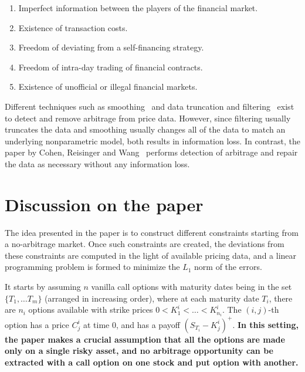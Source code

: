 \documentclass[12pt]{article}
\begin{document}
\begin{enumerate}
    \item Imperfect information between the players of the financial market.
    \item Existence of transaction costs.
    \item Freedom of deviating from a self-financing strategy.
    \item Freedom of intra-day trading of financial contracts.
    \item Existence of unofficial or illegal financial markets.
\end{enumerate}

Different techniques such as smoothing~\cite{ait2003nonparametric,fengler2009arbitrage,fengler2015semi} and data truncation and filtering~\cite{ivanovas2014option} exist to detect and remove arbitrage from price data. However, since filtering usually truncates the data and smoothing usually changes all of the data to match an underlying nonparametric model, both results in information loss. In contrast, the paper by Cohen, Reisinger and Wang~\cite{cohen2020detecting} performs detection of arbitrage and repair the data as necessary without any information loss.

\section{Discussion on the paper}

The idea presented in the paper is to construct different constraints starting from a no-arbitrage market. Once such constraints are created, the deviations from these constraints are computed in the light of available pricing data, and a linear programming problem is formed to minimize the $L_1$ norm of the errors. 

It starts by assuming $n$ vanilla call options with maturity dates being in the set $\{ T_1, \dots T_m \}$ (arranged in increasing order), where at each maturity date $T_i$, there are $n_i$ options available with strike prices $0 < K_1^i < \dots < K_{n_i}^i$. The $(i,j)$-th option has a price $C_j^i$ at time $0$, and has a payoff $(S_{T_i} - K_j^i)^+$. \textbf{In this setting, the paper makes a crucial assumption that all the options are made only on a single risky asset, and no arbitrage opportunity can be extracted with a call option on one stock and put option with another.}
\end{document}

